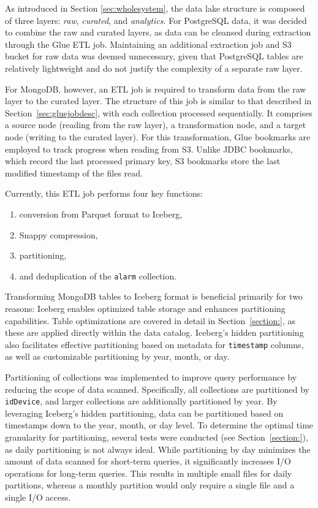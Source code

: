 As introduced in Section \ref{sec:wholesystem}, the data lake structure is composed of three layers: \textit{raw}, \textit{curated}, and \textit{analytics}. For PostgreSQL data, it was decided to combine the raw and curated layers, as data can be cleansed during extraction through the Glue ETL job. Maintaining an additional extraction job and S3 bucket for raw data was deemed unnecessary, given that PostgreSQL tables are relatively lightweight and do not justify the complexity of a separate raw layer.

For MongoDB, however, an ETL job is required to transform data from the raw layer to the curated layer. The structure of this job is similar to that described in Section~\ref{sec:gluejobdesc}, with each collection processed sequentially. It comprises a source node (reading from the raw layer), a transformation node, and a target node (writing to the curated layer). For this transformation, Glue bookmarks are employed to track progress when reading from S3. Unlike JDBC bookmarks, which record the last processed primary key, S3 bookmarks store the last modified timestamp of the files read.

Currently, this ETL job performs four key functions:
\begin{enumerate}
    \item conversion from Parquet format to Iceberg,
    \item Snappy compression,
    \item partitioning,
    \item and deduplication of the \texttt{alarm} collection.
\end{enumerate}
Transforming MongoDB tables to Iceberg format is beneficial primarily for two reasons: Iceberg enables optimized table storage and enhances partitioning capabilities. Table optimizations are covered in detail in Section~\ref{section:}, as these are applied directly within the data catalog. Iceberg’s hidden partitioning also facilitates effective partitioning based on metadata for \texttt{timestamp} columns, as well as customizable partitioning by year, month, or day.

Partitioning of collections was implemented to improve query performance by reducing the scope of data scanned. Specifically, all collections are partitioned by \texttt{idDevice}, and larger collections are additionally partitioned by year. By leveraging Iceberg’s hidden partitioning, data can be partitioned based on timestamps down to the year, month, or day level. To determine the optimal time granularity for partitioning, several tests were conducted (see Section~\ref{section:}), as daily partitioning is not always ideal. While partitioning by day minimizes the amount of data scanned for short-term queries, it significantly increases I/O operations for long-term queries. This results in multiple small files for daily partitions, whereas a monthly partition would only require a single file and a single I/O access. 

